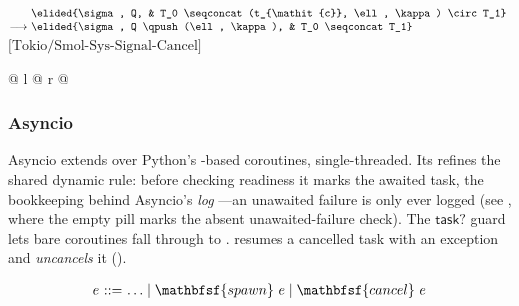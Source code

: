 \vspace{1em}
\noindent
$\begin{array}[t]{@{}r@{\ }l@{\ }l@{}}
                & \elided{\sigma, Q, & T_0 \seqconcat (t_{\mathit{c}}, \ell, \kappa) \circ T_1} \\
\longrightarrow & \elided{\sigma, Q \qpush (\ell, \kappa), & T_0 \seqconcat T_1}
\end{array}$\hfill$\text{[Tokio/Smol-Sys-Signal-Cancel]}$\par
\noindent
\begin{tabular*}{\linewidth}{@{} l @{\extracolsep{\fill}} r @{}}
\end{tabular*}
\vspace{0.7em}

\subsubsection{Asyncio}

Asyncio extends \lasync over Python's \exn-based coroutines, single-threaded. Its  refines the shared dynamic rule: before checking readiness it marks the awaited task, the bookkeeping behind Asyncio's \emph{log} \propagation---an unawaited failure is only ever logged (see , where the empty pill marks the absent unawaited-failure check). The $\mathsf{task?}$ guard lets bare coroutines fall through to .  resumes a cancelled task with an exception and \emph{uncancels} it (\transient \persistence).

$$
\begin{array}{r@{\ }c@{\ }l}
e & ::= & \ldots \mid \mathbfsf{spawn}\ e \mid \mathbfsf{cancel}\ e
\end{array}
$$

